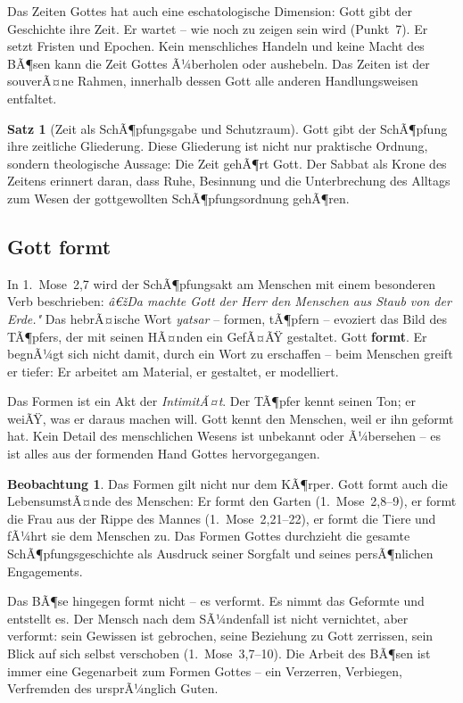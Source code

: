 ﻿\documentclass[a4paper,12pt]{article}
\theoremstyle{definition}
\newtheorem{theorem}{Satz}[section]
\newtheorem{observation}{Beobachtung}[section]
\begin{document}
Das Zeiten Gottes hat auch eine eschatologische Dimension: Gott gibt der Geschichte
ihre Zeit. Er wartet -- wie noch zu zeigen sein wird (Punkt~7). Er setzt Fristen
und Epochen. Kein menschliches Handeln und keine Macht des BÃ¶sen kann die Zeit
Gottes Ã¼berholen oder aushebeln. Das Zeiten ist der souverÃ¤ne Rahmen, innerhalb
dessen Gott alle anderen Handlungsweisen entfaltet.

\begin{theorem}[Zeit als SchÃ¶pfungsgabe und Schutzraum]
	Gott gibt der SchÃ¶pfung ihre zeitliche Gliederung. Diese Gliederung ist nicht
	nur praktische Ordnung, sondern theologische Aussage: Die Zeit gehÃ¶rt Gott.
	Der Sabbat als Krone des Zeitens erinnert daran, dass Ruhe, Besinnung und die
	Unterbrechung des Alltags zum Wesen der gottgewollten SchÃ¶pfungsordnung gehÃ¶ren.
\end{theorem}

\subsection{Gott formt}

In 1.~Mose~2,7 wird der SchÃ¶pfungsakt am Menschen mit einem besonderen Verb
beschrieben: \textit{â€žDa machte Gott der Herr den Menschen aus Staub von der Erde."} 
Das hebrÃ¤ische Wort \textit{yatsar} -- formen, tÃ¶pfern -- evoziert das Bild des
TÃ¶pfers, der mit seinen HÃ¤nden ein GefÃ¤ÃŸ gestaltet. Gott \textbf{formt}. Er
begnÃ¼gt sich nicht damit, durch ein Wort zu erschaffen -- beim Menschen greift
er tiefer: Er arbeitet am Material, er gestaltet, er modelliert.

Das Formen ist ein Akt der \textit{IntimitÃ¤t}. Der TÃ¶pfer kennt seinen Ton; er
weiÃŸ, was er daraus machen will. Gott kennt den Menschen, weil er ihn geformt
hat. Kein Detail des menschlichen Wesens ist unbekannt oder Ã¼bersehen -- es ist
alles aus der formenden Hand Gottes hervorgegangen.

\begin{observation}
	Das Formen gilt nicht nur dem KÃ¶rper. Gott formt auch die LebensumstÃ¤nde des
	Menschen: Er formt den Garten (1.~Mose~2,8--9), er formt die Frau aus der Rippe
	des Mannes (1.~Mose~2,21--22), er formt die Tiere und fÃ¼hrt sie dem Menschen
	zu. Das Formen Gottes durchzieht die gesamte SchÃ¶pfungsgeschichte als Ausdruck
	seiner Sorgfalt und seines persÃ¶nlichen Engagements.
\end{observation}

Das BÃ¶se hingegen formt nicht -- es verformt. Es nimmt das Geformte und entstellt
es. Der Mensch nach dem SÃ¼ndenfall ist nicht vernichtet, aber verformt: sein
Gewissen ist gebrochen, seine Beziehung zu Gott zerrissen, sein Blick auf sich
selbst verschoben (1.~Mose~3,7--10). Die Arbeit des BÃ¶sen ist immer eine
Gegenarbeit zum Formen Gottes -- ein Verzerren, Verbiegen, Verfremden des
ursprÃ¼nglich Guten.
\end{document}
